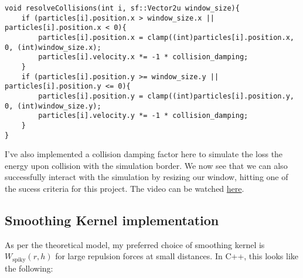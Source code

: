 \documentclass[write-up.tex]{subfiles}
\begin{document}
\begin{lstlisting}
void resolveCollisions(int i, sf::Vector2u window_size){
    if (particles[i].position.x > window_size.x || particles[i].position.x < 0){
        particles[i].position.x = clamp((int)particles[i].position.x, 0, (int)window_size.x);
        particles[i].velocity.x *= -1 * collision_damping;
    }
    if (particles[i].position.y >= window_size.y || particles[i].position.y <= 0){
        particles[i].position.y = clamp((int)particles[i].position.y, 0, (int)window_size.y);
        particles[i].velocity.y *= -1 * collision_damping;
    }
}
\end{lstlisting}

I've also implemented a collision damping factor here to simulate the loss the energy upon collision with the simulation border. We now see that we can also successfully interact with the simulation by resizing our window, hitting one of the sucess criteria for this project. The video can be watched \href{https://youtube.com/shorts/wO0xUBSKVck?feature=share}{here}.
\subsection{Smoothing Kernel implementation}

As per the theoretical model, my preferred choice of smoothing kernel is $W_{\text{spiky}}(r, h)$ for large repulsion forces at small distances. In C++, this looks like the following:


 
\end{document}
